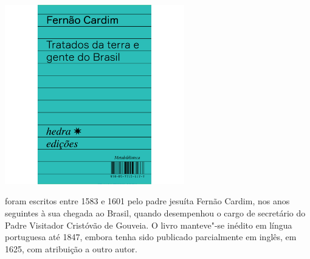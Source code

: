 \vfill

\hspace*{-.4cm}\begin{minipage}[c]{.5\linewidth}
\small{
{}}
\end{minipage}

\pagebreak

\begin{center}
\hspace*{-3.5cm}
\hspace*{3cm}\includegraphics[width=78mm]{./grid/cardim.jpg}
\end{center}

\hspace*{-7cm}\hrulefill\hspace*{-7cm}

\medskip

 foram escritos entre 1583 e 1601 pelo padre jesuíta Fernão Cardim, nos anos seguintes à sua chegada ao Brasil, quando desempenhou o cargo de secretário do Padre Visitador Cristóvão de Gouveia. O livro manteve"-se inédito em língua portuguesa até 1847, embora tenha sido publicado parcialmente em inglês, em 1625, com atribuição a outro autor.

